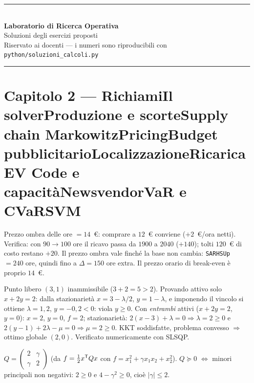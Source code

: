 \documentclass[11pt,a4paper]{article}
\newcounter{cap}
\newcounter{sol}[cap]
\newcommand{\capitolo}[1]{\setcounter{cap}{#1}\section*{Capitolo #1 --- \capnome{#1}}}
\newcommand{\capnome}[1]{%
  \ifcase#1\or\or Richiami\or Il solver\or Produzione e scorte\or Supply chain\or
  Markowitz\or Pricing\or Budget pubblicitario\or Localizzazione\or Ricarica EV\or
  Code e capacità\or Newsvendor\or VaR e CVaR\or SVM\fi}
\begin{document}
\begin{center}
  {\color{blunotte}\rule{\textwidth}{1.5pt}}\\[0.6cm]
  {\LARGE\bfseries\color{blunotte} Laboratorio di Ricerca Operativa}\\[0.25cm]
  {\Large\color{teal} Soluzioni degli esercizi proposti}\\[0.5cm]
  {\small Riservato ai docenti --- i numeri sono riproducibili con
   \texttt{python/soluzioni\_calcoli.py}}\\[0.4cm]
  {\color{blunotte}\rule{\textwidth}{1.5pt}}
\end{center}
\vspace{0.6cm}

\capitolo{2}

\begin{soluzione}[dualità]
Prezzo ombra delle ore $=14$~\euro{}: comprare a $12$~\euro{} conviene
($+2$~\euro/ora netti). Verifica: con $90 \to 100$ ore il ricavo passa da $1900$ a
$2040$ ($+140$); tolti $120$~\euro{} di costo restano $+20$. Il prezzo ombra vale
finché la base non cambia: \texttt{SARHSUp} $= 240$ ore, quindi fino a
$\Delta = 150$ ore extra. Il prezzo orario di break-even è proprio $14$~\euro.
\end{soluzione}

\begin{soluzione}[KKT]
Punto libero $(3,1)$ inammissibile ($3 + 2 = 5 > 2$). Provando attivo solo
$x + 2y = 2$: dalla stazionarietà $x = 3 - \lambda/2$, $y = 1 - \lambda$, e imponendo
il vincolo si ottiene $\lambda = 1{,}2$, $y = -0{,}2 < 0$: viola $y \ge 0$. Con
\emph{entrambi} attivi ($x + 2y = 2$, $y = 0$): $x = 2$, $y = 0$, $f = 2$;
stazionarietà: $2(x - 3) + \lambda = 0 \Rightarrow \lambda = 2 \ge 0$ e
$2(y - 1) + 2\lambda - \mu = 0 \Rightarrow \mu = 2 \ge 0$. KKT soddisfatte, problema
convesso $\Rightarrow$ ottimo globale $(2, 0)$. Verificato numericamente con SLSQP.
\end{soluzione}

\begin{soluzione}[convessità]
$Q = \begin{pmatrix} 2 & \gamma \\ \gamma & 2 \end{pmatrix}$
(da $f = \tfrac12 x^{\mathsf T} Q x$ con $f = x_1^2 + \gamma x_1 x_2 + x_2^2$).
$Q \succeq 0$ $\iff$ minori principali non negativi: $2 \ge 0$ e
$4 - \gamma^2 \ge 0$, cioè $|\gamma| \le 2$.
\end{soluzione}
\end{document}
